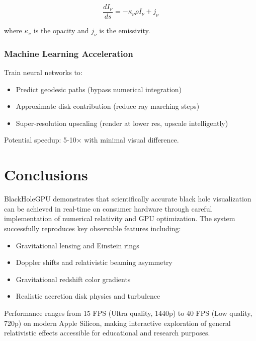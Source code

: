 \documentclass[12pt,a4paper]{article}
\theoremstyle{definition}
\theoremstyle{remark}
\begin{document}
\begin{equation}
    \frac{dI_\nu}{ds} = -\kappa_\nu \rho I_\nu + j_\nu
\end{equation}

where $\kappa_\nu$ is the opacity and $j_\nu$ is the emissivity.

\subsubsection{Machine Learning Acceleration}

Train neural networks to:
\begin{itemize}
    \item Predict geodesic paths (bypass numerical integration)
    \item Approximate disk contribution (reduce ray marching steps)
    \item Super-resolution upscaling (render at lower res, upscale intelligently)
\end{itemize}

Potential speedup: 5-10× with minimal visual difference.

\section{Conclusions}

BlackHoleGPU demonstrates that scientifically accurate black hole visualization can be achieved in real-time on consumer hardware through careful implementation of numerical relativity and GPU optimization. The system successfully reproduces key observable features including:

\begin{itemize}
    \item Gravitational lensing and Einstein rings
    \item Doppler shifts and relativistic beaming asymmetry
    \item Gravitational redshift color gradients
    \item Realistic accretion disk physics and turbulence
\end{itemize}

Performance ranges from 15 FPS (Ultra quality, 1440p) to 40 FPS (Low quality, 720p) on modern Apple Silicon, making interactive exploration of general relativistic effects accessible for educational and research purposes.
\end{document}
